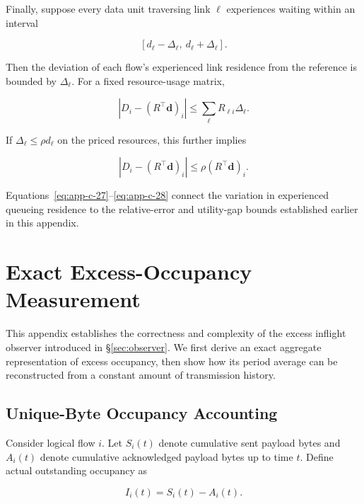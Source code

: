 Finally, suppose every data unit traversing link \(\ell\) experiences waiting within an interval

\begin{equation}
\label{eq:app-c-26}
[d_\ell-\Delta_\ell,\ d_\ell+\Delta_\ell].
\end{equation}

Then the deviation of each flow's experienced link residence from the reference is bounded by \(\Delta_\ell\). For a fixed resource-usage matrix,

\begin{equation}
\label{eq:app-c-27}
\boxed{
\left|D_i-(R^\top\mathbf d)_i\right|
\le
\sum_\ell R_{\ell i}\Delta_\ell.
}
\end{equation}

If \(\Delta_\ell\le\rho d_\ell\) on the priced resources, this further implies

\begin{equation}
\label{eq:app-c-28}
\left|D_i-(R^\top\mathbf d)_i\right|
\le\rho(R^\top\mathbf d)_i.
\end{equation}

Equations~\eqref{eq:app-c-27}–\eqref{eq:app-c-28} connect the variation in experienced queueing residence to the relative-error and utility-gap bounds established earlier in this appendix.

\section{Exact Excess-Occupancy Measurement}
\label{app:d}

This appendix establishes the correctness and complexity of the excess inflight observer introduced in \S\ref{sec:observer}. We first derive an exact aggregate representation of excess occupancy, then show how its period average can be reconstructed from a constant amount of transmission history.

\subsection{Unique-Byte Occupancy Accounting}
\label{app:d-1}

Consider logical flow \(i\). Let \(S_i(t)\) denote cumulative sent payload bytes and \(A_i(t)\) denote cumulative acknowledged payload bytes up to time \(t\). Define actual outstanding occupancy as

\begin{equation}
\label{eq:app-d-1}
I_i(t)=S_i(t)-A_i(t).
\end{equation}

